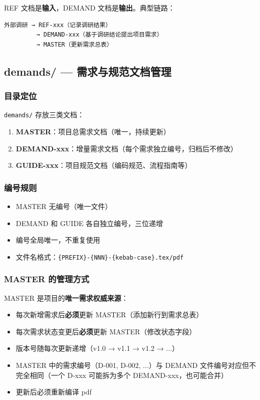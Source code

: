 \documentclass[11pt,a4paper]{article}
\begin{document}
REF 文档是\textbf{输入}，DEMAND 文档是\textbf{输出}。典型链路：
\begin{verbatim}
外部调研 → REF-xxx（记录调研结果）
         → DEMAND-xxx（基于调研结论提出项目需求）
         → MASTER（更新需求总表）
\end{verbatim}

\subsection{demands/ --- 需求与规范文档管理}

\subsubsection{目录定位}

\texttt{demands/} 存放三类文档：

\begin{enumerate}[nosep]
  \item \textbf{MASTER}：项目总需求文档（唯一，持续更新）
  \item \textbf{DEMAND-xxx}：增量需求文档（每个需求独立编号，归档后不修改）
  \item \textbf{GUIDE-xxx}：项目规范文档（编码规范、流程指南等）
\end{enumerate}

\subsubsection{编号规则}

\begin{itemize}[nosep]
  \item MASTER 无编号（唯一文件）
  \item DEMAND 和 GUIDE 各自独立编号，三位递增
  \item 编号全局唯一，不重复使用
  \item 文件名格式：\texttt{\{PREFIX\}-\{NNN\}-\{kebab-case\}.tex/pdf}
\end{itemize}

\subsubsection{MASTER 的管理方式}

MASTER 是项目的\textbf{唯一需求权威来源}：

\begin{itemize}[nosep]
  \item 每次新增需求后\textbf{必须}更新 MASTER（添加新行到需求总表）
  \item 每次需求状态变更后\textbf{必须}更新 MASTER（修改状态字段）
  \item 版本号随每次更新递增（v1.0 → v1.1 → v1.2 → ...）
  \item MASTER 中的需求编号（D-001, D-002, ...）与 DEMAND 文件编号对应但不完全相同（一个 D-xxx 可能拆为多个 DEMAND-xxx，也可能合并）
  \item 更新后必须重新编译 pdf
\end{itemize}
\end{document}
